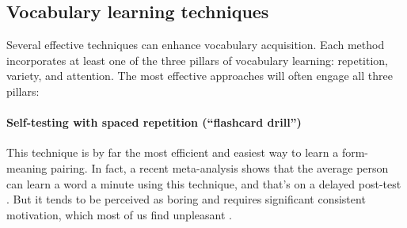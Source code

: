 \newpage
\subsection{Vocabulary learning techniques}

Several effective techniques can enhance vocabulary acquisition. Each method incorporates at least one of the three pillars of vocabulary learning: repetition, variety, and attention. The most effective approaches will often engage all three pillars:

\paragraph*{Self-testing with spaced repetition (``flashcard drill'')} This technique is by far the most efficient and easiest way to learn a form-meaning pairing. In fact, a recent meta-analysis shows that the average person can learn a word a minute using this technique, and that's on a delayed post-test \citep{webb2020}. But it tends to be perceived as boring and requires significant consistent motivation, which most of us find unpleasant \citep{David2024}.

